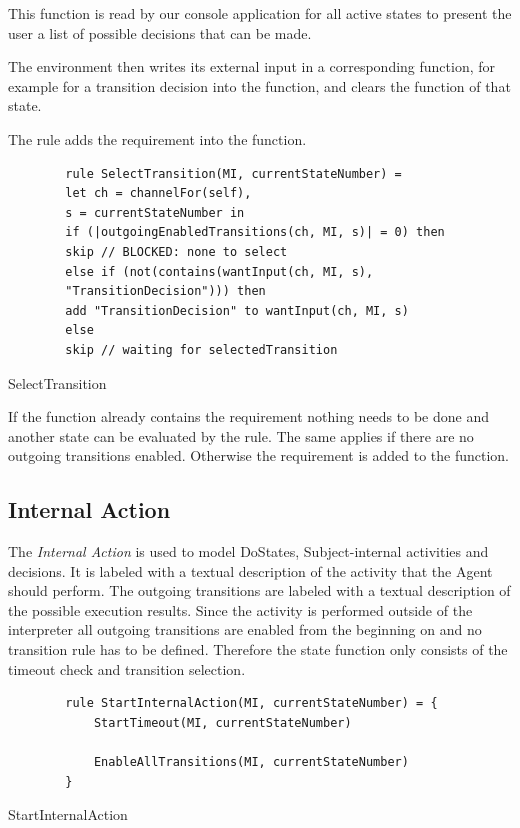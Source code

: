 This function is read by our console application for all active states
to present the user a list of possible decisions that can be made.

The environment then writes its external input in a corresponding function, for
example for a transition decision into the  function, and
clears the  function of that state.

The  rule adds the 
requirement into the  function.


\begin{listing}[H]
	\begin{verbatim}
		rule SelectTransition(MI, currentStateNumber) =
		let ch = channelFor(self),
		s = currentStateNumber in
		if (|outgoingEnabledTransitions(ch, MI, s)| = 0) then
		skip // BLOCKED: none to select
		else if (not(contains(wantInput(ch, MI, s),
		"TransitionDecision"))) then
		add "TransitionDecision" to wantInput(ch, MI, s)
		else
		skip // waiting for selectedTransition
	\end{verbatim}
	\caption{SelectTransition}
	\label{lst:shortasm:SelectTransition}
\end{listing}


If the  function already contains the
 requirement nothing needs to be done and another
state can be evaluated by the  rule.
The same applies if there are no outgoing transitions enabled.
Otherwise the requirement is added to the  function.


\subsection{Internal Action}


The \emph{Internal Action} is used to model DoStates, Subject-internal activities and decisions.
It is labeled with a textual description of the activity that the Agent should perform.
The outgoing transitions are labeled with a textual description of the possible execution results.
Since the activity is performed outside of the interpreter all outgoing transitions are enabled from the beginning on and no transition rule has to be defined.
Therefore the state function only consists of the timeout check and transition selection.


\begin{listing}[H]
	\begin{verbatim}
		rule StartInternalAction(MI, currentStateNumber) = {
			StartTimeout(MI, currentStateNumber)
			
			EnableAllTransitions(MI, currentStateNumber)
		}
	\end{verbatim}
	\caption{StartInternalAction}
	\label{lst:shortasm:StartInternalAction}
\end{listing}



